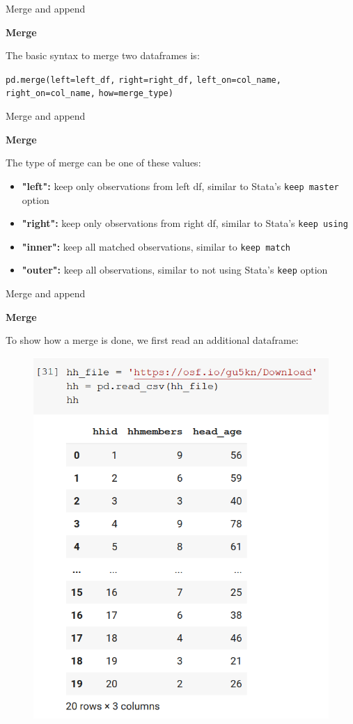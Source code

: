 \documentclass[aspectratio=169]{beamer}
\begin{document}
\begin{frame}{Merge and append}

	\textbf{Merge}

	The basic syntax to merge two dataframes is:

	\hspace{7mm} \texttt{pd.merge(left=left\_df,}
	\newline \hspace*{25.5mm} \texttt{right=right\_df,}
	\newline \hspace*{25.5mm} \texttt{left\_on=col\_name,}
	\newline \hspace*{25.5mm} \texttt{right\_on=col\_name,}
	\newline \hspace*{25.5mm} \texttt{how=merge\_type)}

\end{frame}

\begin{frame}{Merge and append}

	\textbf{Merge}

	The type of merge can be one of these values:

	\begin{itemize}
		\item \textbf{"left":} keep only observations from left df, similar to Stata's \texttt{keep master} option
		\item \textbf{"right":} keep only observations from right df, similar to Stata's \texttt{keep using}
		\item \textbf{"inner":} keep all matched observations, similar to \texttt{keep match}
		\item \textbf{"outer":} keep all observations, similar to not using Stata's \texttt{keep} option
	\end{itemize}

\end{frame}

\begin{frame}{Merge and append}

	\textbf{Merge}

	To show how a merge is done, we first read an additional dataframe:

	\begin{figure}
		\centering
		\includegraphics[width=0.33\linewidth]{img/hh_df.png}
	\end{figure}

\end{frame}
\end{document}
